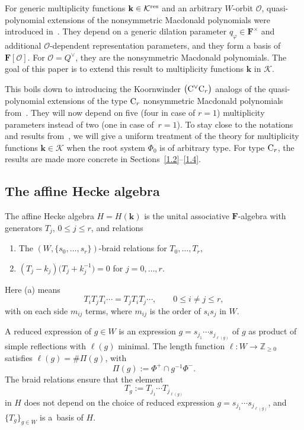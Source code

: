 For generic multiplicity functions $\mathbf{k}\in\mathcal{K}^{{\rm res}}$ and an arbitrary $W$-orbit $\mathcal{O}$, quasi-polynomial extensions of the nonsymmetric Macdonald polynomials were introduced in~\cite{SSV2}. They depend on a generic dilation parameter $q_\varphi\in\mathbf{F}^\times$ and additional $\mathcal{O}$-dependent representation parameters, and they form a basis of $\mathbf{F}[\mathcal{O}]$. For $\mathcal{O}=Q^\vee$, they are the nonsymmetric Macdonald polynomials.
The goal of this paper is to extend this result to multiplicity functions $\mathbf{k}$ in $\mathcal{K}$.

This boils down to introducing the Koornwinder $\bigl({\rm C}^\vee{\rm C}_r\bigr)$ analogs of the quasi-polynomial extensions of the type ${\rm C}_r$ nonsymmetric Macdonald polynomials from~\cite{SSV2}. They will now depend on five (four in case of $r=1$) multiplicity parameters instead of two (one in case of~${r=1}$). To stay close to the notations and results from~\cite{SSV2}, we will give a uniform treatment
of the theory for multiplicity functions $\mathbf{k}\in\mathcal{K}$ when the root system $\Phi_0$ is of arbitrary type. For type ${\rm C}_r$, the results are made more concrete in Sections~\ref{1.2}--\ref{1.4}.

\subsection{The affine Hecke algebra}\label{AHAsection}

The affine Hecke algebra $H=H(\mathbf{k})$ is the unital associative $\mathbf{F}$-algebra with generators $T_j$, $0\leq j\leq r$, and relations
\begin{enumerate}\itemsep=0pt\samepage
\item[(a)] The $(W,\{s_0,\dots,s_r\})$-braid relations for $T_0,\dots,T_r$,
\item[(b)] $(T_j-k_j)\bigl(T_j+k_j^{-1}\bigr)=0$ for $j=0,\dots,r$.
\end{enumerate}\pagebreak

\noindent
Here (a) means{\samepage
\[
T_iT_jT_i\cdots=T_jT_iT_j\cdots,\qquad 0\leq i\not=j\leq r,
\]
with on each side $m_{ij}$ terms, where $m_{ij}$ is the order of $s_is_j$ in $W$.}

A reduced expression of $g\in W$ is an expression $g=s_{j_1}\cdots s_{j_{\ell(g)}}$ of $g$ as product of simple reflections with $\ell(g)$ minimal.
The length function $\ell\colon W\rightarrow\mathbb{Z}_{\geq 0}$ satisfies $\ell(g)=\#\Pi(g)$, with
\[
\Pi(g):=\Phi^+\cap g^{-1}\Phi^-.
\]
The braid relations ensure that the element
\[
T_g:=T_{j_1}\cdots T_{j_{\ell(g)}}
\]
in $H$ does not depend on the choice of reduced expression $g=s_{j_1}\cdots s_{j_{\ell(g)}}$, and $\{T_g\}_{g\in W}$ is a~basis of $H$.

